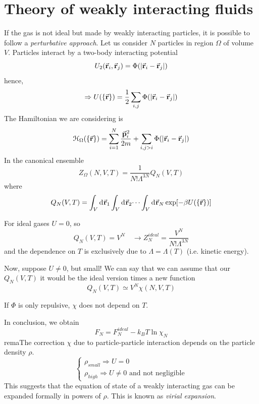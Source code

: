 \documentclass[../main/main.tex]{subfiles}
\begin{document}
\section{Theory of weakly interacting fluids}
If the gas is not ideal but made by weakly interacting particles, it is possible to follow a \emph{perturbative approach}. Let us consider \( N \) particles in region \( \Omega  \) of volume \( V \). Particles interact by a two-body interacting potential
\begin{equation}
  U_2 ( \va{r}_i, \va{r}_j) = \Phi (\abs{\va{r}_i - \va{r}_j} )
\end{equation}
hence,
\begin{equation}
  \Rightarrow U ( \{ \va{r} \}  ) = \frac{1}{2} \sum_{i,j}^{} \Phi (\abs{\va{r}_i - \va{r}_j} )
\end{equation}
The Hamiltonian we are considering is
\begin{equation}
  \mathcal{H}_ \Omega (\{ \va{r} \}  ) = \sum_{i=1}^{N} \frac{\va{p}_i^2}{2m} + \sum_{i,j>i}^{} \Phi (\abs{\va{r}_i - \va{r}_j} )
\end{equation}
In the canonical ensemble
\begin{equation}
  Z_ \Omega (N,V,T) = \frac{1}{N! \Lambda ^{3N}} Q_N (V,T)
\end{equation}
where
\begin{equation}
  Q_N (V,T) = \int_{V}^{} \dd[]{\va{r}_1} \int_{V}^{} \dd[]{\va{r}_2} \dots \int_{V}^{} \dd[]{\va{r}_N} \exp [- \beta U (\{ \va{r} \}  )]
\end{equation}
\begin{remark}
For ideal gases \( U = 0 \), so
\begin{equation}
  Q_N (V,T) = V^N \quad \rightarrow Z_N^{ideal} = \frac{V^N}{N! \Lambda ^{3N}}
\end{equation}
and the dependence on \( T \) is exclusively due to \( \Lambda = \Lambda (T) \) (i.e. kinetic energy).
\end{remark}
Now, suppose \( U \neq 0 \), but small! We can say that we can assume that our \( Q_N (V,T) \) it would be the ideal version times a new function
\begin{equation}
 Q_N (V,T) \simeq V^N \chi (N,V,T)
\end{equation}
\begin{remark}
If \( \Phi  \) is only repulsive, \( \chi  \) does not depend on \( T \).
\end{remark}
In conclusion, we obtain
\begin{equation}
  F_N = F_N^{ideal} - k_B T \ln{\chi _N}
\end{equation}
remaThe correction \( \chi  \) due to particle-particle interaction depends on the particle density \( \rho  \).
\begin{equation}
  \begin{cases}
   \rho _{small} \Rightarrow  U = 0\\
   \rho _{high} \Rightarrow  U \neq 0 \text{ and not negligible}
  \end{cases}
\end{equation}
This suggests that the equation of state of a weakly interacting gas can be expanded formally in powers of \( \rho  \). This is known as \emph{virial expansion}.
\end{document}
